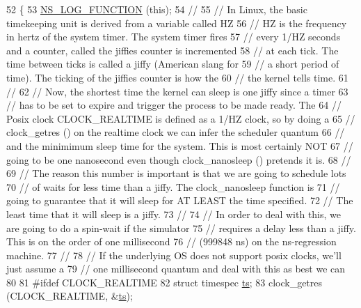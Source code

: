 \begin{DoxyCode}
52 \{
53   \hyperlink{log-macros-disabled_8h_a90b90d5bad1f39cb1b64923ea94c0761}{NS\_LOG\_FUNCTION} (\textcolor{keyword}{this});
54 \textcolor{comment}{//}
55 \textcolor{comment}{// In Linux, the basic timekeeping unit is derived from a variable called HZ}
56 \textcolor{comment}{// HZ is the frequency in hertz of the system timer.  The system timer fires }
57 \textcolor{comment}{// every 1/HZ seconds and a counter, called the jiffies counter is incremented}
58 \textcolor{comment}{// at each tick.  The time between ticks is called a jiffy (American slang for}
59 \textcolor{comment}{// a short period of time).  The ticking of the jiffies counter is how the}
60 \textcolor{comment}{// the kernel tells time.}
61 \textcolor{comment}{//}
62 \textcolor{comment}{// Now, the shortest time the kernel can sleep is one jiffy since a timer}
63 \textcolor{comment}{// has to be set to expire and trigger the process to be made ready.  The}
64 \textcolor{comment}{// Posix clock CLOCK\_REALTIME is defined as a 1/HZ clock, so by doing a}
65 \textcolor{comment}{// clock\_getres () on the realtime clock we can infer the scheduler quantum}
66 \textcolor{comment}{// and the minimimum sleep time for the system.  This is most certainly NOT}
67 \textcolor{comment}{// going to be one nanosecond even though clock\_nanosleep () pretends it is.}
68 \textcolor{comment}{//}
69 \textcolor{comment}{// The reason this number is important is that we are going to schedule lots}
70 \textcolor{comment}{// of waits for less time than a jiffy.  The clock\_nanosleep function is}
71 \textcolor{comment}{// going to guarantee that it will sleep for AT LEAST the time specified.}
72 \textcolor{comment}{// The least time that it will sleep is a jiffy.}
73 \textcolor{comment}{//}
74 \textcolor{comment}{// In order to deal with this, we are going to do a spin-wait if the simulator}
75 \textcolor{comment}{// requires a delay less than a jiffy.  This is on the order of one millisecond}
76 \textcolor{comment}{// (999848 ns) on the ns-regression machine.}
77 \textcolor{comment}{// }
78 \textcolor{comment}{// If the underlying OS does not support posix clocks, we'll just assume a }
79 \textcolor{comment}{// one millisecond quantum and deal with this as best we can}
80 
81 \textcolor{preprocessor}{#ifdef CLOCK\_REALTIME}
82   \textcolor{keyword}{struct }timespec \hyperlink{lte_2model_2fading-traces_2fading__trace__generator_8m_ada841f58d7be618bfbc76c87e7d44086}{ts};
83   clock\_getres (CLOCK\_REALTIME, &\hyperlink{lte_2model_2fading-traces_2fading__trace__generator_8m_ada841f58d7be618bfbc76c87e7d44086}{ts});

\end{DoxyCode}
